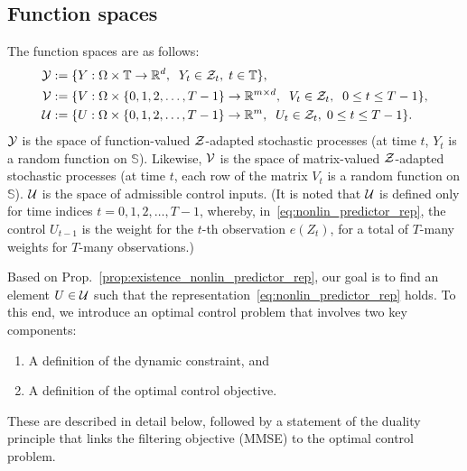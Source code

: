 \documentclass[twoside,11pt]{article}
\def\Re{\mathbb{R}}
\newcommand{\field}[1]{\mathbb{#1}}
\def\Re{\field{R}}
\def\clZ{{\cal Z}}
\def\clZ{{\cal Z}}
\def\bS{\begin{slide}}
\def\Re{\mathbb{R}}
\def\clY{{\cal Y}}
\def\Prop#1{Prop.~\ref{#1}}
\def\clZ{{\cal Z}}
\renewcommand{\Re}{\mathbb{R}}
\def\clU{{\cal U}}
\def\clV{{\cal V}}
\def\clY{{\cal Y}}
\def\clZ{{\cal Z}}
\def\bS{\mathbb{S}}
\begin{document}
\subsection{Function spaces}

The function spaces are as follows:
\begin{align*}
  \clY & :=\{Y:\Omega\times \mathbb{T} \to \Re^d, \;\;
       Y_t\in\clZ_t, \;t\in\mathbb{T} \},\\
  \clV & :=\{V:\Omega \times \{0,1,2,\hdots,T-1\}\to \Re^{m\times d}, \;\;V_t\in\clZ_t, \;\;0\leq t\leq T-1 \},\\
  \clU & :=\{U:\Omega\times \{0,1,2,\hdots,T-1\} \to \Re^m, \;\;U_t\in\clZ_t, \;0\leq t\leq T-1\}.
\end{align*}
$\clY$ is the space of function-valued $\clZ$-adapted stochastic
processes (at time $t$, $Y_t$ is a random function on $\bS$).  
Likewise, $\clV$ is the space of matrix-valued $\clZ$-adapted stochastic processes (at time $t$, each row of the matrix $V_t$ is a random function on $\bS$).  
$\clU$ is the space of admissible control inputs. 
(It is noted that $\clU$ is defined only for time indices
$t=0,1,2,\hdots,T-1$, whereby, in~\eqref{eq:nonlin_predictor_rep}, the control $U_{t-1}$ is the weight for
the $t$-th observation $e(Z_{t})$, for a total of $T$-many weights for
$T$-many observations.)

Based on \Prop{prop:existence_nonlin_predictor_rep}, our goal is to find an element $U\in \clU$ such that the representation~\eqref{eq:nonlin_predictor_rep} holds.  
To this end, we introduce an optimal control problem that involves two key components: 
\begin{enumerate} 
  \item A definition of the dynamic constraint, and
  \item A definition of the optimal control objective.
\end{enumerate}
These are described in detail below, followed by a statement of the duality principle that links the filtering objective (MMSE) to the optimal control problem.
\end{document}
